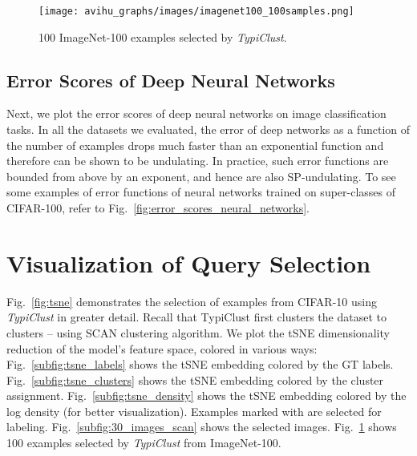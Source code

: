 \documentclass{article}
\begin{document}
\begin{figure}[thb!]
\begin{center}
      \texttt{[image: avihu\_graphs/images/imagenet100\_100samples.png]}
    \caption{100 ImageNet-100 examples selected by \emph{TypiClust}. }
    \label{fig:imagenet_images}
\end{center}
\end{figure}




\subsection{Error Scores of Deep Neural Networks}
\label{sec:error-dnn}

Next, we plot the error scores of deep neural networks on image classification tasks. In all the datasets we evaluated, the error of deep networks as a function of the number of examples drops much faster than an exponential function and therefore can be shown to be undulating. In practice, such error functions are bounded from above by an exponent, and hence are also SP-undulating. To see some examples of error functions of neural networks trained on super-classes of CIFAR-100, refer to Fig.~\ref{fig:error_scores_neural_networks}.

\section{Visualization of Query Selection}












Fig.~\ref{fig:tsne} demonstrates the selection of  examples from CIFAR-10 using \emph{TypiClust} in greater detail. Recall that TypiClust first clusters the dataset to  clusters -- using SCAN clustering algorithm. We plot the tSNE dimensionality reduction of the model's feature space, colored in various ways: Fig.~\ref{subfig:tsne_labels} shows the tSNE embedding colored by the GT labels.  Fig.~\ref{subfig:tsne_clusters} shows the tSNE embedding colored by the cluster assignment.  Fig.~\ref{subfig:tsne_density} shows the tSNE embedding colored by the log density (for better visualization).  Examples marked with  are selected for labeling. Fig.~\ref{subfig:30_images_scan} shows the selected images. Fig.~\ref{fig:imagenet_images} shows 100 examples selected by \emph{TypiClust} from ImageNet-100. 
\end{document}
